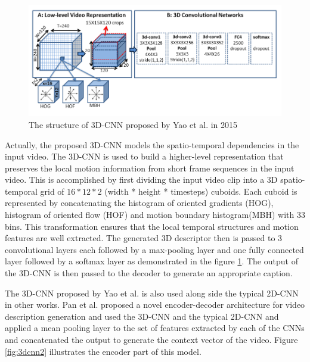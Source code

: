 \documentclass[preprint, 12pt]{elsarticle}
\begin{document}
		\begin{figure}[h]
			\centering
			\includegraphics[scale=0.5]{Imgs/3DCNN.png}
			\caption{The structure of 3D-CNN proposed by Yao et al. in 2015 \cite{yao2015describing}}
			\label{fig:3dcnn}
		\end{figure}
	
		Actually, the proposed 3D-CNN models the spatio-temporal dependencies in the input video. The 3D-CNN is used to build a higher-level representation that preserves the local motion information from short frame sequences in the input video. This is accomplished by first dividing the input video clip into a 3D spatio-temporal grid of $16 * 12 * 2$ (width * height * timesteps) cuboids. Each cuboid is represented by concatenating the histogram of oriented gradients (HOG), histogram of oriented flow (HOF) and motion boundary histogram(MBH) with 33 bins. This transformation ensures that the local temporal structures and motion features are well extracted. The generated 3D descriptor then is passed to 3 convolutional layers each followed by a max-pooling layer and one fully connected layer followed by a softmax layer as demonstrated in the figure \ref{fig:3dcnn}. The output of the 3D-CNN is then passed to the decoder to generate an appropriate caption.
		
		The 3D-CNN proposed by Yao et al. \cite{yao2015describing} is also used along side the typical 2D-CNN in other works. Pan et al. \cite{pan2016jointly} proposed a novel encoder-decoder architecture for video description generation and used the 3D-CNN and the typical 2D-CNN and applied a mean pooling layer to the set of features extracted by each of the CNNs and concatenated the output to generate the context vector of the video. Figure \ref{fig:3dcnn2} illustrates the encoder part of this model.
		
\end{document}

